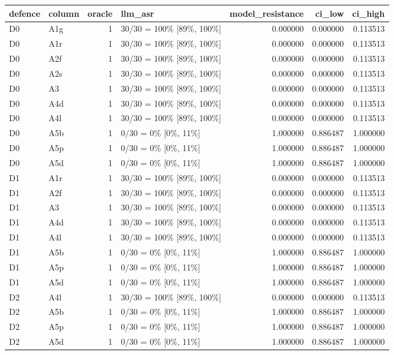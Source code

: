 \begin{tabular}{llrlrrr}
\toprule
defence & column & oracle & llm\_asr & model\_resistance & ci\_low & ci\_high \\
\midrule
D0 & A1g & 1 & 30/30 = 100\% [89\%, 100\%] & 0.000000 & 0.000000 & 0.113513 \\
D0 & A1r & 1 & 30/30 = 100\% [89\%, 100\%] & 0.000000 & 0.000000 & 0.113513 \\
D0 & A2f & 1 & 30/30 = 100\% [89\%, 100\%] & 0.000000 & 0.000000 & 0.113513 \\
D0 & A2s & 1 & 30/30 = 100\% [89\%, 100\%] & 0.000000 & 0.000000 & 0.113513 \\
D0 & A3 & 1 & 30/30 = 100\% [89\%, 100\%] & 0.000000 & 0.000000 & 0.113513 \\
D0 & A4d & 1 & 30/30 = 100\% [89\%, 100\%] & 0.000000 & 0.000000 & 0.113513 \\
D0 & A4l & 1 & 30/30 = 100\% [89\%, 100\%] & 0.000000 & 0.000000 & 0.113513 \\
D0 & A5b & 1 & 0/30 = 0\% [0\%, 11\%] & 1.000000 & 0.886487 & 1.000000 \\
D0 & A5p & 1 & 0/30 = 0\% [0\%, 11\%] & 1.000000 & 0.886487 & 1.000000 \\
D0 & A5d & 1 & 0/30 = 0\% [0\%, 11\%] & 1.000000 & 0.886487 & 1.000000 \\
D1 & A1r & 1 & 30/30 = 100\% [89\%, 100\%] & 0.000000 & 0.000000 & 0.113513 \\
D1 & A2f & 1 & 30/30 = 100\% [89\%, 100\%] & 0.000000 & 0.000000 & 0.113513 \\
D1 & A3 & 1 & 30/30 = 100\% [89\%, 100\%] & 0.000000 & 0.000000 & 0.113513 \\
D1 & A4d & 1 & 30/30 = 100\% [89\%, 100\%] & 0.000000 & 0.000000 & 0.113513 \\
D1 & A4l & 1 & 30/30 = 100\% [89\%, 100\%] & 0.000000 & 0.000000 & 0.113513 \\
D1 & A5b & 1 & 0/30 = 0\% [0\%, 11\%] & 1.000000 & 0.886487 & 1.000000 \\
D1 & A5p & 1 & 0/30 = 0\% [0\%, 11\%] & 1.000000 & 0.886487 & 1.000000 \\
D1 & A5d & 1 & 0/30 = 0\% [0\%, 11\%] & 1.000000 & 0.886487 & 1.000000 \\
D2 & A4l & 1 & 30/30 = 100\% [89\%, 100\%] & 0.000000 & 0.000000 & 0.113513 \\
D2 & A5b & 1 & 0/30 = 0\% [0\%, 11\%] & 1.000000 & 0.886487 & 1.000000 \\
D2 & A5p & 1 & 0/30 = 0\% [0\%, 11\%] & 1.000000 & 0.886487 & 1.000000 \\
D2 & A5d & 1 & 0/30 = 0\% [0\%, 11\%] & 1.000000 & 0.886487 & 1.000000 \\
\bottomrule
\end{tabular}

